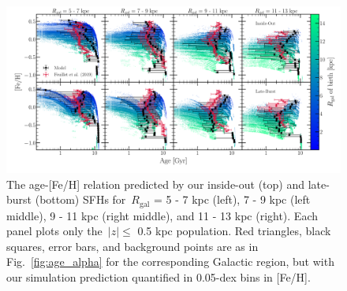 \documentclass[fleqn, usenatbib]{mnras}
\begin{document}
\begin{figure} 
\centering 
\includegraphics[scale = 0.35]{amr_insideout_vs_lateburst_fe.pdf} 
\caption{The age-[Fe/H] relation predicted by our inside-out (top) and 
late-burst (bottom) SFHs for~$R_\text{gal}$ = 5 - 7 kpc (left), 7 - 9 kpc 
(left middle), 9 - 11 kpc (right middle), and 11 - 13 kpc (right). Each panel 
plots only the~$\left|z\right|\leq$ 0.5 kpc population. Red triangles, black 
squares, error bars, and background points are as in 
Fig.~\ref{fig:age_alpha} for the corresponding 
Galactic region, but with our simulation prediction quantified in 
0.05-dex bins in [Fe/H]. } 
\label{fig:amr_insideout_vs_lateburst_fe} 
\end{figure} 
\end{document}
